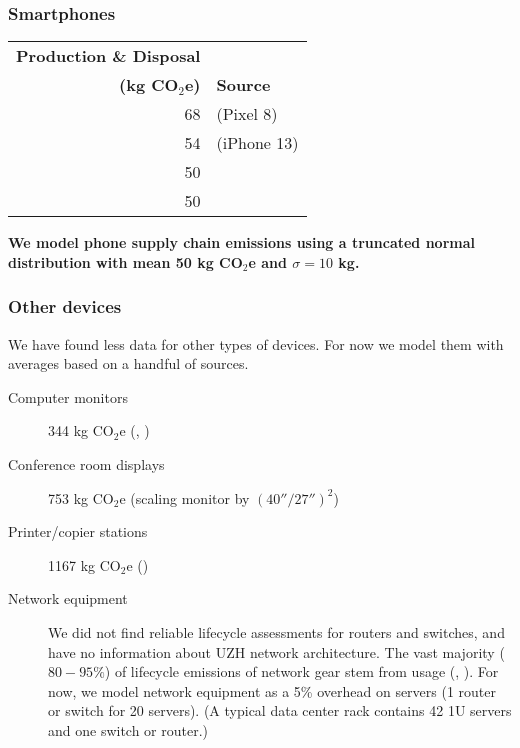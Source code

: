 \documentclass[11pt]{article}
\newcommand{\assumption}[1]{{\bf #1}}
\begin{document}
\subsubsection{Smartphones}

\begin{center}
\begin{tabular}{|r|l|}
\hline
\textbf{Production \& Disposal} & \\
\textbf{(kg CO$_2$e)} & \textbf{Source} \\ \hline
68 & \textcite{googlepixel8} (Pixel 8)\\ \hline
54 & \textcite{appleiphone13} (iPhone 13)\\ \hline
50 & \textcite{unctadder2024} \\ \hline
50 & \textcite{lovehagen2023} \\ \hline
\end{tabular}
\label{tab:embodied_emissions:phones}
\end{center}

\assumption{We model phone supply chain emissions using a truncated normal distribution with mean
50 kg CO$_2$e and $\sigma = 10$ kg.}

\subsubsection{Other devices}

We have found less data for other types of devices. For now we model them with averages based
on a handful of sources.

\begin{description}
    \item[Computer monitors] 344 kg CO$_2$e (\textcite{teehan2013}, \textcite{dellpcf})
    \item[Conference room displays] 753 kg CO$_2$e (scaling monitor by $(40''/27'')^2$)
    \item[Printer/copier stations] 1167 kg CO$_2$e (\textcite{ecoinvent})
    \item[Network equipment] We did not find reliable lifecycle assessments for routers and switches,
      and have no information about UZH network architecture. The vast majority ($80-95\%$) of
      lifecycle emissions of network gear stem from usage (\textcite{cisco2024}, \textcite{jacob2023}).
      For now, we model network equipment as a 5\% overhead on servers (1 router or switch for 20 servers).
      (A typical data center rack contains 42 1U servers and one switch or router.)
\end{description}
\end{document}
